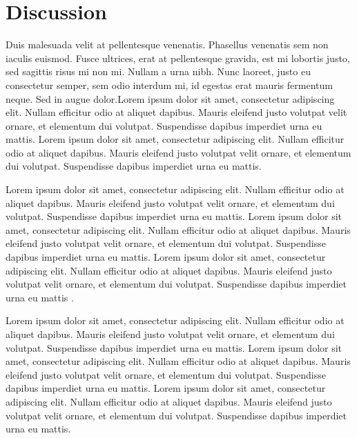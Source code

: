 \documentclass[12pt]{article}
\begin{document}
\section{Discussion}

Duis malesuada velit at pellentesque venenatis. Phasellus venenatis sem non iaculis euismod. Fusce ultrices, erat at pellentesque gravida, est mi lobortis justo, sed sagittis risus mi non mi. Nullam a urna nibh. Nunc laoreet, justo eu consectetur semper, sem odio interdum mi, id egestas erat mauris fermentum neque. Sed in augue dolor.Lorem ipsum dolor sit amet, consectetur adipiscing elit. Nullam efficitur odio at aliquet dapibus. Mauris eleifend justo volutpat velit ornare, et elementum dui volutpat. Suspendisse dapibus imperdiet urna eu mattis. Lorem ipsum dolor sit amet, consectetur adipiscing elit. Nullam efficitur odio at aliquet dapibus. Mauris eleifend justo volutpat velit ornare, et elementum dui volutpat. Suspendisse dapibus imperdiet urna eu mattis. 

Lorem ipsum dolor sit amet, consectetur adipiscing elit. Nullam efficitur odio at aliquet dapibus. Mauris eleifend justo volutpat velit ornare, et elementum dui volutpat. Suspendisse dapibus imperdiet urna eu mattis. Lorem ipsum dolor sit amet, consectetur adipiscing elit. Nullam efficitur odio at aliquet dapibus. Mauris eleifend justo volutpat velit ornare, et elementum dui volutpat. Suspendisse dapibus imperdiet urna eu mattis. Lorem ipsum dolor sit amet, consectetur adipiscing elit. Nullam efficitur odio at aliquet dapibus. Mauris eleifend justo volutpat velit ornare, et elementum dui volutpat. Suspendisse dapibus imperdiet urna eu mattis \parencite{Dell2010}. 

Lorem ipsum dolor sit amet, consectetur adipiscing elit. Nullam efficitur odio at aliquet dapibus. Mauris eleifend justo volutpat velit ornare, et elementum dui volutpat. Suspendisse dapibus imperdiet urna eu mattis. Lorem ipsum dolor sit amet, consectetur adipiscing elit. Nullam efficitur odio at aliquet dapibus. Mauris eleifend justo volutpat velit ornare, et elementum dui volutpat. Suspendisse dapibus imperdiet urna eu mattis. Lorem ipsum dolor sit amet, consectetur adipiscing elit. Nullam efficitur odio at aliquet dapibus. Mauris eleifend justo volutpat velit ornare, et elementum dui volutpat. Suspendisse dapibus imperdiet urna eu mattis. 



\printbibliography[title={Book Sources}]
\end{document}
